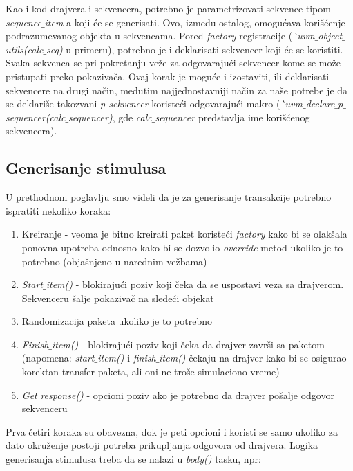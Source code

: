 Kao i kod drajvera i sekvencera, potrebno je parametrizovati sekvence tipom
\emph{sequence\(\_\)item}-a koji će se generisati. Ovo, između ostalog,
omogućava korišćenje podrazumevanog objekta u sekvencama. Pored \emph{factory}
registracije (\emph{\`\ uvm\(\_\)object\(\_\)utils(calc\(\_\)seq)} u primeru),
potrebno je i deklarisati sekvencer koji će se koristiti. Svaka sekvenca se pri
pokretanju veže za odgovarajući sekvencer kome se može pristupati preko
pokazivača. Ovaj korak je moguće i izostaviti, ili deklarisati sekvencere na
drugi način, međutim najjednostavniji način za naše potrebe je da se deklariše
takozvani \emph{p sekvencer} koristeći odgovarajući makro
(\emph{\`\ uvm\(\_\)declare\(\_\)p\(\_\)sequencer(calc\(\_\)sequencer)}, gde
\emph{calc\(\_\)sequencer} predstavlja ime korišćenog sekvencera).


\subsection{Generisanje stimulusa}

U prethodnom poglavlju smo videli da je za generisanje transakcije potrebno
ispratiti nekoliko koraka:

\begin{enumerate}
\item Kreiranje - veoma je bitno kreirati paket koristeći \emph{factory} kako bi
  se olakšala ponovna upotreba odnosno kako bi se dozvolio \emph{override} metod
  ukoliko je to potrebno (objašnjeno u narednim vežbama)
\item \emph{Start\(\_\)item()} - blokirajući poziv koji čeka da se uspostavi
  veza sa drajverom. Sekvenceru šalje pokazivač na sledeći objekat
\item Randomizacija paketa ukoliko je to potrebno
\item \emph{Finish\(\_\)item()} - blokirajući poziv koji čeka da drajver završi
  sa paketom (napomena: \emph{start\(\_\)item()} i \emph{finish\(\_\)item()}
  čekaju na drajver kako bi se osigurao korektan transfer paketa, ali oni ne
  troše simulaciono vreme)
\item \emph{Get\(\_\)response()} - opcioni poziv ako je potrebno da drajver
  pošalje odgovor sekvenceru
\end{enumerate}

Prva četiri koraka su obavezna, dok je peti opcioni i koristi se samo ukoliko za
dato okruženje postoji potreba prikupljanja odgovora od drajvera. Logika
generisanja stimulusa treba da se nalazi u \emph{body()} tasku, npr:

